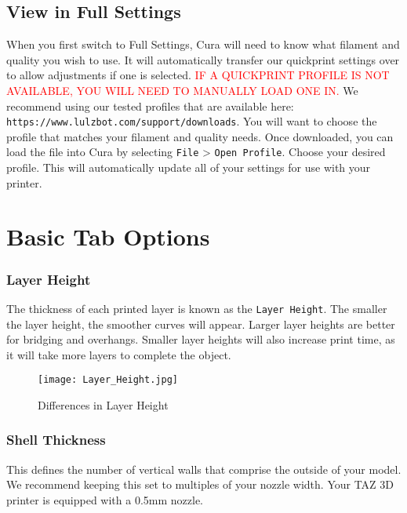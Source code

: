 \subsection{View in Full Settings}
When you first switch to Full Settings, Cura will need to know what filament and quality you wish to use. It will automatically transfer our quickprint settings over to allow adjustments if one is selected. \textcolor{red}{IF A QUICKPRINT PROFILE IS NOT AVAILABLE, YOU WILL NEED TO MANUALLY LOAD ONE IN.} We recommend using our tested profiles that are available here: \texttt{https://www.lulzbot.com/support/downloads}. You will want to choose the profile that matches your filament and quality needs. Once downloaded, you can load the file into Cura by selecting \texttt{File} > \texttt{Open Profile}. Choose your desired profile. This will automatically update all of your settings for use with your printer.

\section{Basic Tab Options}

\subsubsection{Layer Height}
The thickness of each printed layer is known as the \texttt{Layer Height}. The smaller the layer height, the smoother curves will appear. Larger layer heights are better for bridging and overhangs. Smaller layer heights will also increase print time, as it will take more layers to complete the object.
\begin{figure}[H]
\centering
\texttt{[image: Layer\_Height.jpg]}
\caption{Differences in Layer Height}
\label{fig:Differences in Layer Height}
\end{figure}


\subsubsection{Shell Thickness}
This defines the number of vertical walls that comprise the outside of your model. We recommend keeping this set to multiples of your nozzle width. Your TAZ 3D printer is equipped with a 0.5mm nozzle. %

